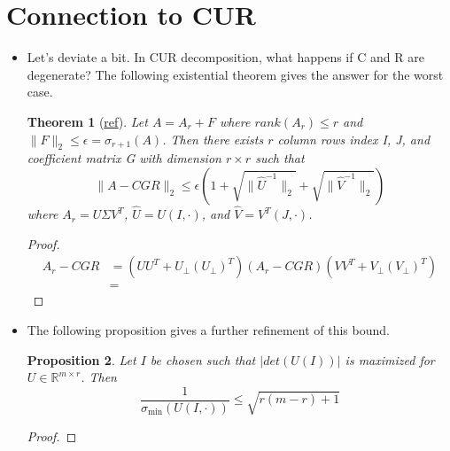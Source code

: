 \documentclass[11pt,reqno]{amsart}
\newtheorem{theorem}{Theorem}
\newtheorem{proposition}[theorem]{Proposition}
\theoremstyle{remark}
\begin{document}
\begin{sloppypar}
\section{Connection to CUR}
\begin{itemize}
\item Let's deviate a bit. In CUR decomposition, what happens if C and R are degenerate? The following existential theorem gives the answer for the worst case.
\begin{theorem}[\href{ttps://www.sciencedirect.com/science/article/pii/S0024379596003011}{ref}]
Let $A=A_r+F$ where $rank(A_r)\leq r$ and
$\lVert F\rVert_2\leq \epsilon=\sigma_{r+1}(A)$.
Then there exists $r$ column rows index I, J, and coefficient matrix G with dimension $r\times r$ such that
\[
\lVert A-CGR\rVert_2\leq \epsilon(1+\sqrt{\lVert \hat U^{-1}\rVert_2}+
\sqrt{\lVert \hat V^{-1}\rVert_2})
\]
where $A_r=U\Sigma V^T$, $\hat U=U(I, \cdot)$, and $\hat V=V^T(J,\cdot)$.
\end{theorem}
\begin{proof}
\begin{align*}
  A_r-CGR&=(U U^T + U_{\perp} (U_{\perp})^T)(A_r-CGR)(V V^T + V_{\perp} (V_{\perp})^T)\\
  &= 
\end{align*}
\end{proof}
\item The following proposition gives a further refinement of this bound.
\begin{proposition}
Let $I$ be chosen such that $|det(U(I))|$ is maximized for $U\in\mathbb{R}^{m\times r}$. Then
\[
\frac 1{\sigma_{\min}(U(I,\cdot))}\leq\sqrt{r(m-r)+1}
\]
\end{proposition}
\begin{proof}


\end{proof}
\end{itemize}
\end{sloppypar}
\end{document}
